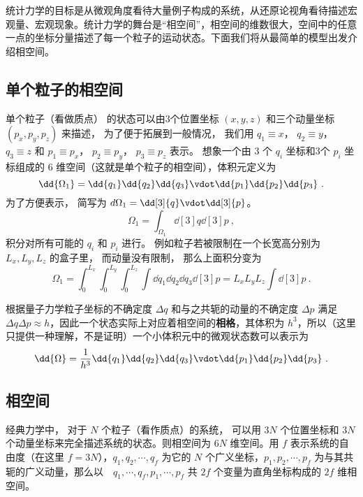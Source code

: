 
\begin{issues}
\issueMissDepend
\end{issues}

统计力学的目标是从微观角度看待大量例子构成的系统，从还原论视角看待描述宏观量、宏观现象。统计力学的舞台是“相空间”，相空间的维数很大，空间中的任意一点的坐标分量描述了每一个粒子的运动状态。下面我们将从最简单的模型出发介绍相空间。

\subsection{单个粒子的相空间}

单个粒子（看做质点） 的状态可以由3个位置坐标 $(x,y,z)$ 和三个动量坐标 $(p_x, p_y, p_z)$ 来描述， 为了便于拓展到一般情况， 我们用 $q_1 \equiv x$，   $q_2 \equiv y$， $q_3 \equiv z$   和 $p_1 \equiv p_x$， $p_2 \equiv p_y$， $p_3 \equiv p_z$ 表示。 想象一个由 3 个 $q_i$  坐标和3个 $p_i$  坐标组成的 $6$ 维空间（这就是单个粒子的相空间），体积元定义为
\begin{equation}
\dd{\Omega_1} = \dd{q_1}\dd{q_2}\dd{q_3} \vdot \dd{p_1}\dd{p_2}\dd{p_3}~.
\end{equation} 
为了方便表示， 简写为  $d{\Omega_1} = \dd[3]{q} \vdot \dd[3]{p}$。 
\begin{equation}
\Omega_1 = \int_{\Omega_1} \dd[3]{q} \dd[3]{p}~,
\end{equation} 
积分对所有可能的 $q_i$ 和 $p_i$ 进行。 例如粒子若被限制在一个长宽高分别为 $L_x, L_y, L_z$ 的盒子里， 而动量没有限制， 那么上面积分变为
\begin{equation}
\Omega_1 = \int_0^{L_x} \int_0^{L_y} \int_0^{L_z} \int \dd{q_1} \dd{q_2} \dd{q_3} \dd[3]{p} = L_x L_y L_z\int \dd[3]{p} ~.
\end{equation} 

根据量子力学粒子坐标的不确定度 $\Delta q$ 和与之共轭的动量的不确定度 $\Delta p$ 满足 $\Delta q\Delta p\approx h$，因此一个状态实际上对应着相空间的\textbf{相格}，其体积为 $h^3$，所以（这里只提供一种理解，不是证明）一个小体积元中的微观状态数可以表示为
\begin{equation}
\dd{\Omega}=\frac{1}{h^3}\dd{q_1}\dd{q_2}\dd{q_3} \vdot \dd{p_1}\dd{p_2}\dd{p_3}~.
\end{equation}

\subsection{相空间}
经典力学中， 对于 $N$ 个粒子（看作质点）的系统， 可以用 $3N$ 个位置坐标和 $3N$ 个动量坐标来完全描述系统的状态。则相空间为 $6N$ 维空间。用 $f$ 表示系统的自由度（在这里 $f=3N$），$q_1,q_2,\cdots,q_f$ 为它的 $N$ 个广义坐标，$p_1,p_2,\cdots,p_f$ 为与其共轭的广义动量，那么以　$q_1,\cdots,q_f,p_1,\cdots,p_f$ 共 $2f$ 个变量为直角坐标构成的 $2f$ 维相空间。


